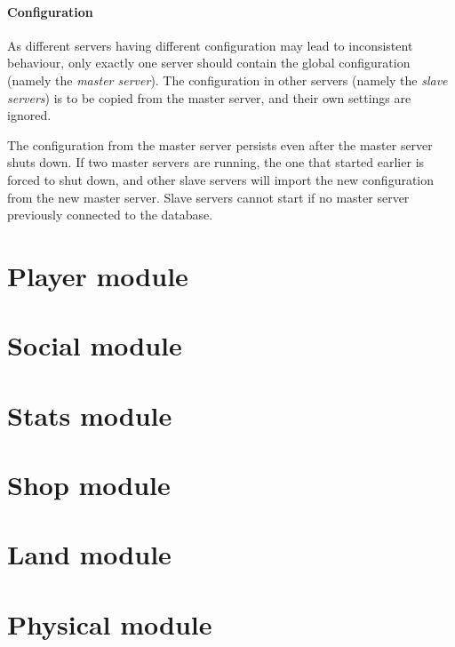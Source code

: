 \documentclass{report}
\begin{document}
				\subsection{Configuration}
					As different servers having different configuration may lead to inconsistent behaviour,
					only exactly one server should contain the global configuration (namely the \emph{master server}).
					The configuration in other servers (namely the \emph{slave servers}) is to be copied from the master server,
					and their own settings are ignored.

					The configuration from the master server persists even after the master server shuts down.
					If two master servers are running, the one that started earlier is forced to shut down,
					and other slave servers will import the new configuration from the new master server.
					Slave servers cannot start if no master server previously connected to the database.

	\part{Player module}

	\part{Social module}

	\part{Stats module}

	\part{Shop module}

	\part{Land module}

	\part{Physical module}
\end{document}
